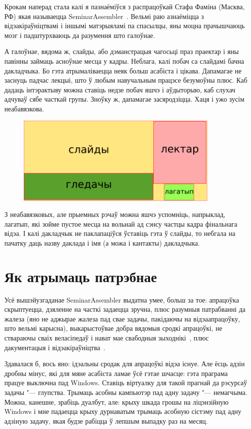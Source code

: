 \documentclass[10pt, a5paper]{article}
\begin{document}
Крокам наперад стала калі я пазнаёміўся з распрацоўкай Стафа Фаміна (Масква, РФ) якая называецца SeminarAssembler~\cite{Zakharevich3}. Вельмі раю азнаёміцца з відэакіраўніцтвамі і іншымі матэрыяламі па спасылцы, яны моцна прачышчаюць мозг і падштурхваюць да разумення што галоўнае.

А галоўнае, вядома ж, слайды, або дэманстрацыя чагосьці праз праектар і яны павінны займаць асноўнае месца у кадры. Неблага, калі побач са слайдамі бачна дакладчыка. Бо гэта атрымаліваецца неяк больш асабіста і цікава. Дапамагае не заснуць падчас лекцыі, што ў любым навучальным працэсе безумоўны плюс. Каб дадаць інтэрактыву можна ставіць недзе побач яшчэ і аўдыторыю, каб слухач адчуваў сябе часткай групы. Зноўку ж, дапамагае засяродзіцца. Хаця і ужо зусім неабавязкова.

\begin{figure}[h!]
  \centering
  \includegraphics[width=10cm]{32_2016_Zakharevich3.png}
\end{figure}

З неабавязковых, але прыемных рэчаў можна яшчэ успомніць, напрыклад, лагатып, які зойме пустое месца на вольнай ад сэнсу частцы кадра фінальнага відэа. І калі дакладчык не паклапаціўся ўставіць гэта ў слайды, то небгала на пачатку даць назву даклада і імя (а можа і кантакты) дакладчыка.

\section*{Як атрымаць патрэбнае}

Усё вышэйузгаданае SeminarAssembler выдатна умее, больш за тое: апрацоўка скрыптуецца, дзяленне на часткі задаецца зручна, плюс разумныя патрабванні да жалеза (яно не аджырае жалеза пад свае задачы, пакідаючы на відэаапрацоўку, што вельмі карысна), выкарыстоўвае добра вядомыя сродкі апрацоўкі, не ствараючы сваіх веласіпедаў і нават мае свабодныя зыходнікі~\cite{Zakharevich4}, плюс дакументацыя і відэакіраўніцтва~\cite{Zakharevich3}.

Здавалася б, вось яно: ідэальны сродак для апрацоўкі відэа існуе. Але ёсць адзін дробны мінус, які для мяне асабіста ламае ўсё гэтае шчасце: гэта праграма працуе выключна пад Windows. Ставіць віртуалку для такой прагнай да рэсурсаў задачы "--- глупства. Трымаць асобны кампьютэр пад адну задачу "--- немагчыма. Можна, канешне, зрабіць дуалбут, але: крыху шкада грошы на ліцэнзійную Windows і мне падаецца крыху дурнаватым трымаць асобную сістэму пад адну адзіную задачу, якая будзе рабіцца ў лепшым выпадку раз на месяц.
\end{document}
